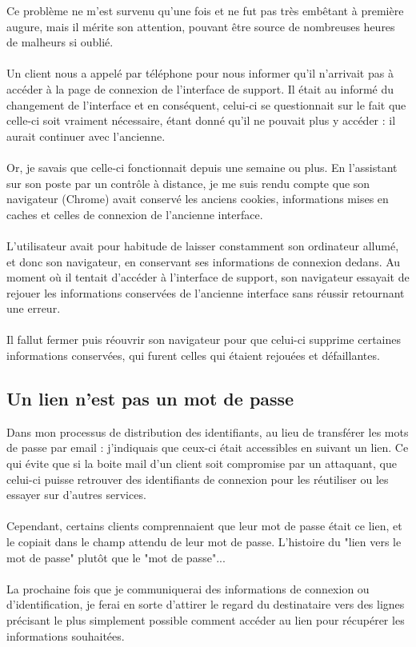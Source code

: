 Ce problème ne m'est survenu qu'une fois et ne fut pas très embêtant à première augure, mais il mérite son attention, pouvant être source de nombreuses heures de malheurs si oublié.
\\ \\
Un client nous a appelé par téléphone pour nous informer qu'il n'arrivait pas à accéder à la page de connexion de l'interface de support. Il était au informé du changement de l'interface et en conséquent, celui-ci se questionnait sur le fait que celle-ci soit vraiment nécessaire, étant donné qu'il ne pouvait plus y accéder : il aurait continuer avec l'ancienne.
\\ \\
Or, je savais que celle-ci fonctionnait depuis une semaine ou plus. En l'assistant sur son poste par un contrôle à distance, je me suis rendu compte que son navigateur (Chrome) avait conservé les anciens cookies, informations mises en caches et celles de connexion de l'ancienne interface.
\\ \\
L'utilisateur avait pour habitude de laisser constamment son ordinateur allumé, et donc son navigateur, en conservant ses informations de connexion dedans. Au moment où il tentait d'accéder à l'interface de support, son navigateur essayait de rejouer les informations conservées de l'ancienne interface sans réussir retournant une erreur.
\\ \\
Il fallut fermer puis réouvrir son navigateur pour que celui-ci supprime certaines informations conservées, qui furent celles qui étaient rejouées et défaillantes.

\subsection{Un lien n'est pas un mot de passe}

Dans mon processus de distribution des identifiants, au lieu de transférer les mots de passe par email : j'indiquais que ceux-ci était accessibles en suivant un lien. Ce qui évite que si la boite mail d'un client soit compromise par un attaquant, que celui-ci puisse retrouver des identifiants de connexion pour les réutiliser ou les essayer sur d'autres services.
\\ \\
Cependant, certains clients comprennaient que leur mot de passe était ce lien, et le copiait dans le champ attendu de leur mot de passe. L'histoire du "lien vers le mot de passe" plutôt que le "mot de passe"...
\\ \\
La prochaine fois que je communiquerai des informations de connexion ou d'identification, je ferai en sorte d'attirer le regard du destinataire vers des lignes précisant le plus simplement possible comment accéder au lien pour récupérer les informations souhaitées.


